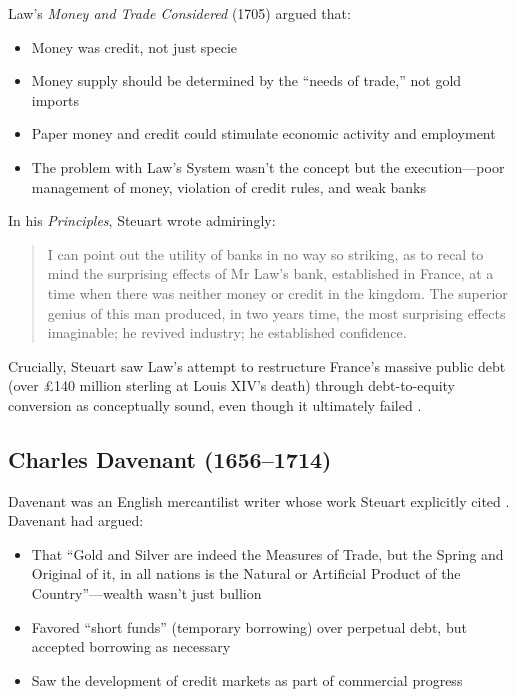 \documentclass[12pt]{article}
\begin{document}
Law's \textit{Money and Trade Considered} (1705) argued that:

\begin{itemize}
\item Money was credit, not just specie
\item Money supply should be determined by the ``needs of trade,'' not gold imports
\item Paper money and credit could stimulate economic activity and employment
\item The problem with Law's System wasn't the concept but the execution—poor management of money, violation of credit rules, and weak banks
\end{itemize}

In his \textit{Principles}, Steuart wrote admiringly:

\begin{quote}
I can point out the utility of banks in no way so striking, as to recal to mind the surprising effects of Mr Law's bank, established in France, at a time when there was neither money or credit in the kingdom. The superior genius of this man produced, in two years time, the most surprising effects imaginable; he revived industry; he established confidence.
\end{quote}

Crucially, Steuart saw Law's attempt to restructure France's massive public debt (over £140 million sterling at Louis XIV's death) through debt-to-equity conversion as conceptually sound, even though it ultimately failed \citep{velde2003, murphy1997}.

\subsection{Charles Davenant (1656--1714)}

Davenant was an English mercantilist writer whose work Steuart explicitly cited \citep{davenant1698}. Davenant had argued:

\begin{itemize}
\item That ``Gold and Silver are indeed the Measures of Trade, but the Spring and Original of it, in all nations is the Natural or Artificial Product of the Country''—wealth wasn't just bullion
\item Favored ``short funds'' (temporary borrowing) over perpetual debt, but accepted borrowing as necessary
\item Saw the development of credit markets as part of commercial progress
\end{itemize}
\end{document}
